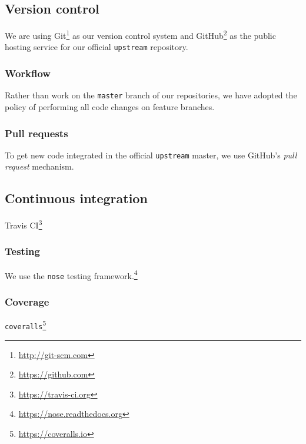 \cite{millman2014}

\subsection{Version control}

We are using Git\footnote{\url{http://git-scm.com}} as our version control
system and GitHub\footnote{\url{https://github.com}} as the public hosting
service for our official \texttt{upstream} repository.

\subsubsection{Workflow}

Rather than work on the \texttt{master} branch of our repositories,
we have adopted the policy of performing all code changes on
feature branches.

\subsubsection{Pull requests}

To get new code integrated in the official \texttt{upstream} master,
we use GitHub's \emph{pull request} mechanism.

\subsection{Continuous integration}

Travis CI\footnote{\url{https://travis-ci.org}}

\subsubsection{Testing}

We use the \texttt{nose} testing framework.\footnote{\url{https://nose.readthedocs.org}}

\subsubsection{Coverage}

\texttt{coveralls}\footnote{\url{https://coveralls.io}}
